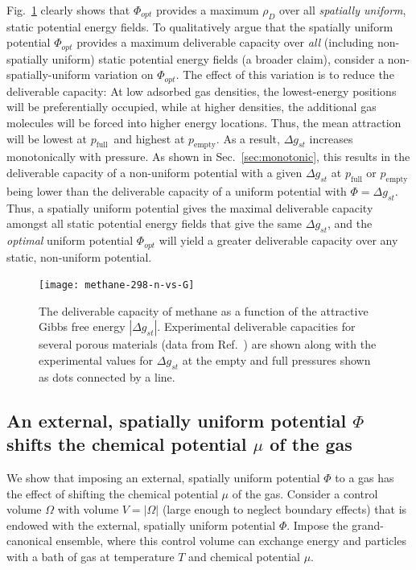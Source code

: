 \documentclass[twoside,twocolumn,9pt]{article}
\newcommand\V{\Phi}
\newcommand\pfull{\ensuremath{p_{\text{full}}}}
\newcommand\pempty{\ensuremath{p_{\text{empty}}}}
\newcommand\gst{\ensuremath{\Delta g_{st}}}
\begin{document}
Fig.~\ref{fig:methane-298-D} clearly shows that $\V_{opt}$ provides a maximum
$\rho_D$ over all \emph{spatially uniform}, static potential energy fields. To
qualitatively argue that the spatially uniform potential $\V_{opt}$ provides a
maximum deliverable capacity over \emph{all} (including non-spatially uniform)
static potential energy fields (a broader claim), consider a
non-spatially-uniform variation on $\V_{opt}$. The effect of
this variation is to reduce the deliverable capacity: At low adsorbed gas
densities, the lowest-energy positions will be preferentially occupied, while
at higher densities, the additional gas molecules will be forced into higher
energy locations. Thus, the mean attraction will be lowest at \pfull\ and
highest at \pempty. As a result, $\gst$ increases monotonically with
pressure. As shown in Sec.~\ref{sec:monotonic}, this results in
the deliverable capacity of a non-uniform potential with a given $\gst$ at $\pfull$ or $\pempty$ being lower than the
deliverable capacity of a uniform potential with $\V=\gst$. Thus, a spatially uniform potential gives the maximal
deliverable capacity amongst all static potential energy fields that give the
same $\gst$, and the \emph{optimal} uniform potential $\V_{opt}$ will yield a
greater deliverable capacity over any static, non-uniform potential.

\begin{figure}
    \centering
    \texttt{[image: methane-298-n-vs-G]}
    \caption{The deliverable capacity of methane as a function of the attractive Gibbs free energy $|\gst|$.
    Experimental deliverable capacities for several porous materials (data from Ref.~\cite{mason2014evaluating, furukawa2009storage}) are shown along with the experimental values for $\gst$ at the empty and full pressures shown as dots connected by a line.}
    \label{fig:methane-298-D}
\end{figure}

\subsection{An external, spatially uniform potential $\V$ shifts the chemical potential $\mu$ of the gas} \label{sec:V_shifts_chem_pot}
We show that imposing an external, spatially uniform potential $\V$ to a gas
has the effect of shifting the chemical potential $\mu$ of the gas. Consider a control volume $\Omega$ with volume
$V=|\Omega|$ (large enough to neglect boundary effects) that is endowed with
the external, spatially uniform potential $\V$. Impose the grand-canonical
ensemble, where this control volume can exchange energy and particles with a
bath of gas at temperature $T$ and chemical potential $\mu$.
\end{document}
